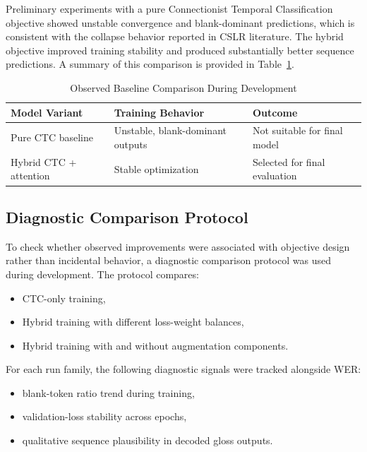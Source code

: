 Preliminary experiments with a pure Connectionist Temporal Classification objective showed unstable convergence and blank-dominant predictions, which is consistent with the collapse behavior reported in CSLR literature. The hybrid objective improved training stability and produced substantially better sequence predictions. A summary of this comparison is provided in Table~\ref{tab:baseline_compare}.

\begin{table}[H]
\centering
\caption{Observed Baseline Comparison During Development}
\label{tab:baseline_compare}
\begingroup
\small
\setlength{\tabcolsep}{4pt}
\begin{tabularx}{\textwidth}{@{}p{3.1cm}X p{3.1cm}@{}}
\toprule
\textbf{Model Variant} & \textbf{Training Behavior} & \textbf{Outcome} \\
\midrule
Pure CTC baseline & Unstable, blank-dominant outputs & Not suitable for final model \\
Hybrid CTC + attention & Stable optimization & Selected for final evaluation \\
\bottomrule
\end{tabularx}
\endgroup
\end{table}

\subsection{Diagnostic Comparison Protocol}

To check whether observed improvements were associated with objective design rather than incidental behavior, a diagnostic comparison protocol was used during development. The protocol compares:
\begin{itemize}
    \item CTC-only training,
    \item Hybrid training with different loss-weight balances,
    \item Hybrid training with and without augmentation components.
\end{itemize}

For each run family, the following diagnostic signals were tracked alongside WER:
\begin{itemize}
    \item blank-token ratio trend during training,
    \item validation-loss stability across epochs,
    \item qualitative sequence plausibility in decoded gloss outputs.
\end{itemize}

